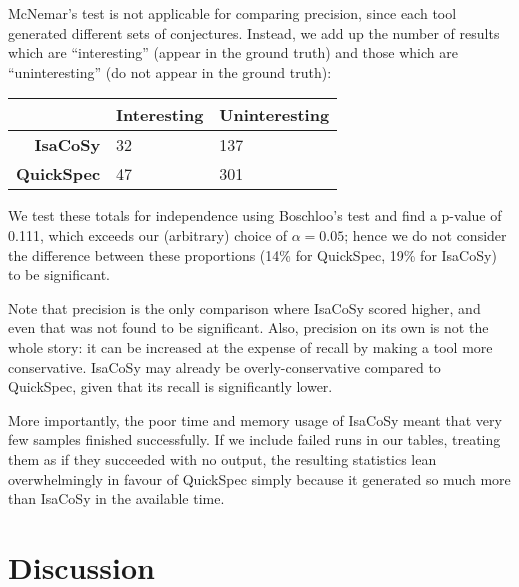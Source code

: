 McNemar's test is not applicable for comparing precision, since each tool
generated different sets of conjectures. Instead, we add up the number of
results which are ``interesting'' (appear in the ground truth) and those which
are ``uninteresting'' (do not appear in the ground truth):

\begin{table}[H]
  \centering
  \begin{tabular}{ |r|l|l| }
    \hline
              & \bfseries Interesting & \bfseries Uninteresting \\
    \hline
    \bfseries IsaCoSy   & 32          & 137      \\
    \hline
    \bfseries QuickSpec & 47          & 301      \\
    \hline
  \end{tabular}
\end{table}

We test these totals for independence using Boschloo's test and find a p-value
of 0.111, which exceeds our (arbitrary) choice of $\alpha = 0.05$; hence we do
not consider the difference between these proportions (14\% for QuickSpec, 19\%
for IsaCoSy) to be significant.

Note that precision is the only comparison where IsaCoSy scored higher, and even
that was not found to be significant. Also, precision on its own is not the
whole story: it can be increased at the expense of recall by making a tool more
conservative. IsaCoSy may already be overly-conservative compared to QuickSpec,
given that its recall is significantly lower.

More importantly, the poor time and memory usage of IsaCoSy meant that very few
samples finished successfully. If we include failed runs in our tables, treating
them as if they succeeded with no output, the resulting statistics lean
overwhelmingly in favour of QuickSpec simply because it generated so much more
than IsaCoSy in the available time.

\section{Discussion}
\label{sec:discussion}

